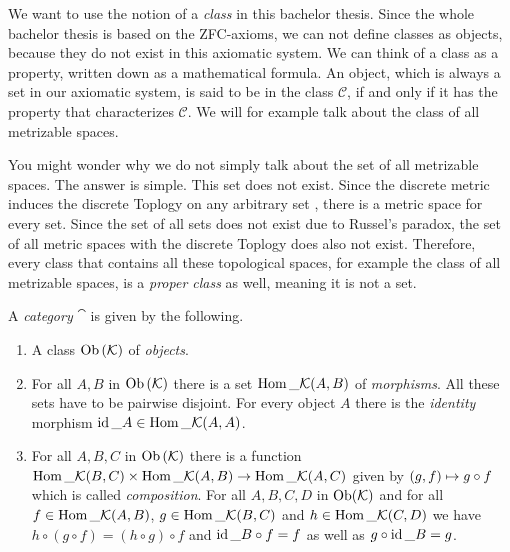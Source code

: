 We want to use the notion of a \textit{class} in this bachelor thesis. Since the whole bachelor thesis is based on the ZFC-axioms, we can not define classes as objects, because they do not exist in this axiomatic system. We can think of a class as a property, written down as a mathematical formula. An object, which is always a set in our axiomatic system, is said to be in the class $\mathcal{C}$, if and only if it has the property that characterizes $\mathcal{C}$. We will for example talk about the class of all metrizable spaces. 

You might wonder why we do not simply talk about the set of all metrizable spaces. The answer is simple. This set does not exist. Since the discrete metric induces the discrete Toplogy on any arbitrary set \cite[p.414]{Ana1&2}, there is a metric space for every set. Since the set of all sets does not exist due to Russel's paradox, the set of all metric spaces with the discrete Toplogy does also not exist. Therefore, every class that contains all these topological spaces, for example the class of all metrizable spaces, is a \textit{proper class} as well, meaning it is not a set.

\begin{definition}
	A \textit{category} $\cat$ is given by the following.
	\begin{enumerate}
		\item A class $\operatorname{Ob}{\left ( \mathcal K \right )}$ of \textit{objects}.
		\item For all $A, B$ in $\operatorname{Ob}{\left ( \mathcal K \right )}$ there is a set $\operatorname{Hom}\_\mathcal K{\left ( A, B \right )}$ of \textit{morphisms}. All these sets have to be pairwise disjoint. For every object $A$ there is the \textit{identity} morphism $\operatorname{id}\_A \in \operatorname{Hom}\_\mathcal K{\left ( A, A \right )}$.
		\item For all $A, B, C$ in $\operatorname{Ob}{\left ( \mathcal K \right )}$ there is a function $\operatorname{Hom}\_\mathcal K{\left ( B, C \right )} \times \operatorname{Hom}\_\mathcal K{\left ( A, B \right )} \to \operatorname{Hom}\_\mathcal K{\left ( A, C \right )}$ given by ${\left ( g, f \right )} \mapsto g \circ f$ which is called \textit{composition}. For all $A, B, C, D$ in $\operatorname{Ob}(\mathcal K)$ and for all $f \in \operatorname{Hom}\_\mathcal K(A, B)$, $g \in \operatorname{Hom}\_\mathcal K(B,C)$ and $h \in \operatorname{Hom}\_\mathcal K(C,D)$ we have $h \circ (g \circ f) = (h \circ g) \circ f$ and $\operatorname{id}\_B \circ f = f$ as well as $g \circ \operatorname{id}\_B = g$. 
	\end{enumerate}
\end{definition}

